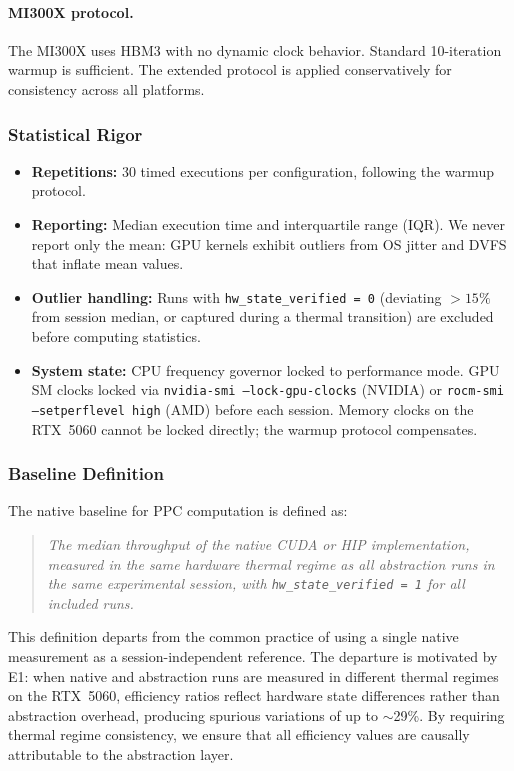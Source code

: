 \paragraph{MI300X protocol.}
The MI300X uses HBM3 with no dynamic clock behavior. Standard 10-iteration
warmup is sufficient. The extended protocol is applied conservatively for
consistency across all platforms.

\subsubsection{Statistical Rigor}

\begin{itemize}
    \item \textbf{Repetitions:} 30 timed executions per configuration,
    following the warmup protocol.
    \item \textbf{Reporting:} Median execution time and interquartile range
    (IQR). We never report only the mean: GPU kernels exhibit outliers from
    OS jitter and DVFS that inflate mean values.
    \item \textbf{Outlier handling:} Runs with \texttt{hw\_state\_verified = 0}
    (deviating $> 15\%$ from session median, or captured during a thermal
    transition) are excluded before computing statistics.
    \item \textbf{System state:} CPU frequency governor locked to performance
    mode. GPU SM clocks locked via \texttt{nvidia-smi --lock-gpu-clocks}
    (NVIDIA) or \texttt{rocm-smi --setperflevel high} (AMD) before each
    session. Memory clocks on the RTX~5060 cannot be locked directly; the
    warmup protocol compensates.
\end{itemize}

\subsubsection{Baseline Definition}

The native baseline for PPC computation is defined as:

\begin{quote}
\emph{The median throughput of the native CUDA or HIP implementation, measured
in the same hardware thermal regime as all abstraction runs in the same
experimental session, with \texttt{hw\_state\_verified = 1} for all included
runs.}
\end{quote}

\noindent This definition departs from the common practice of using a single
native measurement as a session-independent reference. The departure is
motivated by E1: when native and abstraction runs are measured in different
thermal regimes on the RTX~5060, efficiency ratios reflect hardware state
differences rather than abstraction overhead, producing spurious variations of
up to $\sim$29\%. By requiring thermal regime consistency, we ensure that all
efficiency values are causally attributable to the abstraction layer.

